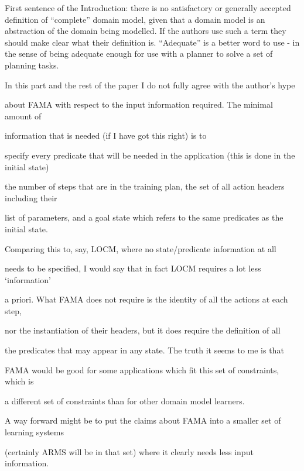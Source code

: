 \documentclass{article}
\begin{document}
\begin{mdframed}[hidealllines=true,backgroundcolor=gray!20]
First sentence of the Introduction: there is no satisfactory or generally accepted definition of “complete” domain model, given that a domain model is an abstraction of the domain being modelled. If the authors use such a term they should  make clear what their definition is. “Adequate” is a better word to use - in the sense of being adequate enough for use with a planner to solve a set of planning  tasks.
\end{mdframed}

\begin{mdframed}[hidealllines=true,backgroundcolor=gray!20]
  In this part and the rest of the paper I do not fully agree with the author’s hype 

about FAMA with respect to the input information required. The minimal amount of

information that is needed (if I have got this right) is to 

specify every predicate that will be needed in the application (this is done in the initial state)

the number of steps that are in the training plan, the set of all action headers including their 

list of parameters, and a goal state which refers to the same predicates as the initial state.

 Comparing this to, say, LOCM, where no state/predicate information at all

needs to be specified, I would say that in fact LOCM requires a lot less ‘information’ 

a priori. What FAMA does not require is the identity of all the actions at each step,

nor the instantiation of their headers, but it does require the definition of all

the predicates that may appear in any state. The truth it seems to me is that 

FAMA would be good for some applications which fit this set of constraints, which is

a different set of constraints than for other domain model learners.

A way forward might be to put the claims about FAMA into a smaller set of learning systems

(certainly ARMS will be in that set) where it clearly needs less input information.
\end{mdframed}
\end{document}
